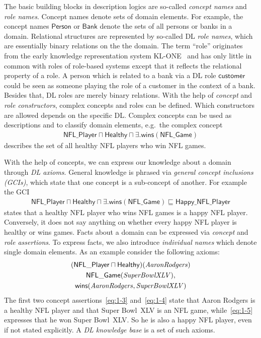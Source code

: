 The basic building blocks in description logics are so-called \emph{concept names} and \emph{role
  names}. Concept names denote sets of domain elements. For example, the concept names
$\mathsf{Person}$ or $\mathsf{Bank}$ denote the sets of all persons or banks in a domain. Relational
structures are represented by so-called DL \emph{role names}, which are essentially binary relations
on the the domain. The term ``role'' originates from the early knowledge representation system
KL-ONE~\cite{WoS-CMA133} and has only little in common with roles of role-based systems except that
it reflects the relational property of a role. A person which is related to a bank via a DL role
$\mathsf{customer}$ could be seen as someone playing the role of a customer in the context of a
bank. Besides that, DL roles are merely binary relations. With the help of \emph{concept} and
\emph{role constructors}, complex concepts and roles can be defined.  Which constructors are allowed
depends on the specific DL. Complex concepts can be used as descriptions and to classify domain
elements, e.g.\ the complex concept
\begin{align}
  \label{eq:1-1}
  \mathsf{NFL\_Player} \sqcap \mathsf{Healthy} \sqcap \exists.\mathsf{wins}(\mathsf{NFL\_Game})
\end{align}
describes the set of all healthy NFL players who win NFL games.

With the help of concepts, we can express our knowledge about a domain through \emph{DL
  axioms}. General knowledge is phrased via \emph{general concept inclusions (GCIs)}, which state
that one concept is a sub-concept of another. For example the GCI
\begin{align}
  \label{eq:1-2}
  \mathsf{NFL\_Player} \sqcap \mathsf{Healthy} \sqcap
  \exists.\mathsf{wins}(\mathsf{NFL\_Game}) \sqsubseteq \mathsf{Happy\_NFL\_Player}
\end{align}
states that a healthy NFL player who wins NFL games is a happy NFL player. Conversely, it does not say
anything on whether every happy NFL player is healthy or wins games. Facts about a domain can be
expressed via \emph{concept} and \emph{role assertions}.  To express facts, we also introduce
\emph{individual names} which denote single domain elements. As an example consider the following axioms:
\begin{gather}
  (\mathsf{NFL\_Player} \sqcap \mathsf{Healthy})(\text{\textit{AaronRodgers}})\label{eq:1-3}\\
  \mathsf{NFL\_Game}(\text{\textit{SuperBowlXLV}}),\label{eq:1-4}\\
  \mathsf{\mathsf{wins}}(\text{\textit{AaronRodgers}},\text{\textit{SuperBowlXLV}})\label{eq:1-5}
\end{gather}
The first two concept assertions~\eqref{eq:1-3} and~\eqref{eq:1-4} state that Aaron Rodgers is a healthy NFL player and that Super Bowl~XLV is
an NFL game, while~\eqref{eq:1-5} expresses that he won Super Bowl~XLV. So he is also a happy
NFL player, even if not stated explicitly.  A \emph{DL knowledge base} is a set of such axioms.

